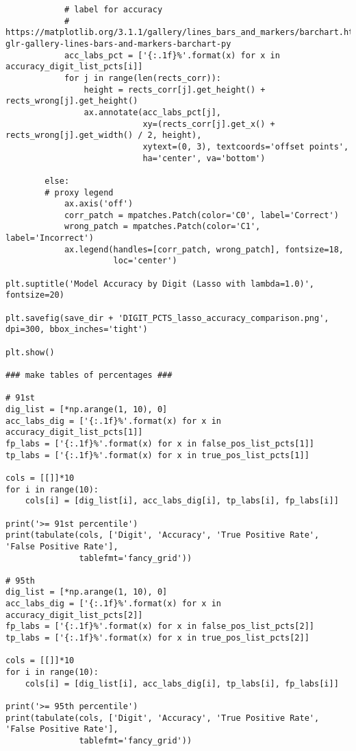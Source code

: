 \documentclass[10pt]{article}
\begin{document}
\begin{lstlisting}
            # label for accuracy
            # https://matplotlib.org/3.1.1/gallery/lines_bars_and_markers/barchart.html#sphx-glr-gallery-lines-bars-and-markers-barchart-py
            acc_labs_pct = ['{:.1f}%'.format(x) for x in accuracy_digit_list_pcts[i]]
            for j in range(len(rects_corr)):
                height = rects_corr[j].get_height() + rects_wrong[j].get_height()
                ax.annotate(acc_labs_pct[j],
                            xy=(rects_corr[j].get_x() + rects_wrong[j].get_width() / 2, height),
                            xytext=(0, 3), textcoords='offset points',
                            ha='center', va='bottom')
            
        else:
        # proxy legend
            ax.axis('off')
            corr_patch = mpatches.Patch(color='C0', label='Correct')
            wrong_patch = mpatches.Patch(color='C1', label='Incorrect')
            ax.legend(handles=[corr_patch, wrong_patch], fontsize=18,
                      loc='center')

plt.suptitle('Model Accuracy by Digit (Lasso with lambda=1.0)', fontsize=20)

plt.savefig(save_dir + 'DIGIT_PCTS_lasso_accuracy_comparison.png', dpi=300, bbox_inches='tight')

plt.show()

### make tables of percentages ###

# 91st
dig_list = [*np.arange(1, 10), 0]
acc_labs_dig = ['{:.1f}%'.format(x) for x in accuracy_digit_list_pcts[1]]
fp_labs = ['{:.1f}%'.format(x) for x in false_pos_list_pcts[1]]
tp_labs = ['{:.1f}%'.format(x) for x in true_pos_list_pcts[1]]

cols = [[]]*10
for i in range(10):
    cols[i] = [dig_list[i], acc_labs_dig[i], tp_labs[i], fp_labs[i]]

print('>= 91st percentile')
print(tabulate(cols, ['Digit', 'Accuracy', 'True Positive Rate', 'False Positive Rate'],
               tablefmt='fancy_grid'))

# 95th
dig_list = [*np.arange(1, 10), 0]
acc_labs_dig = ['{:.1f}%'.format(x) for x in accuracy_digit_list_pcts[2]]
fp_labs = ['{:.1f}%'.format(x) for x in false_pos_list_pcts[2]]
tp_labs = ['{:.1f}%'.format(x) for x in true_pos_list_pcts[2]]

cols = [[]]*10
for i in range(10):
    cols[i] = [dig_list[i], acc_labs_dig[i], tp_labs[i], fp_labs[i]]

print('>= 95th percentile')
print(tabulate(cols, ['Digit', 'Accuracy', 'True Positive Rate', 'False Positive Rate'],
               tablefmt='fancy_grid'))


\end{lstlisting}
\end{document}

